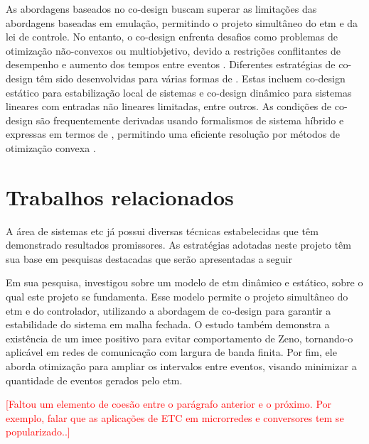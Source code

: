 As abordagens baseados no co-design buscam superar as limitações das abordagens baseadas em emulação, permitindo o projeto simultâneo do \acrshort{etm} e da lei de controle. No entanto, o co-design enfrenta desafios como problemas de otimização não-convexos ou multiobjetivo, devido a restrições conflitantes de desempenho e aumento dos tempos entre eventos \cite{coutinho2021}. Diferentes estratégias de co-design têm sido desenvolvidas para várias formas de . Estas incluem co-design estático para estabilização local de sistemas  e co-design dinâmico para sistemas lineares com entradas não lineares limitadas, entre outros. As condições de co-design são frequentemente derivadas usando formalismos de sistema híbrido e expressas em termos de , permitindo uma eficiente resolução por métodos de otimização convexa \cite{coutinho2021}.

\section{Trabalhos relacionados}

A área de sistemas \acrshort{etc} já possui diversas técnicas estabelecidas que têm demonstrado resultados promissores. As estratégias adotadas neste projeto têm sua base em pesquisas destacadas que serão apresentadas a seguir

Em sua pesquisa, \cite{coutinho2021} investigou sobre um modelo de \acrshort{etm} dinâmico e estático, sobre o qual este projeto se fundamenta. Esse modelo permite o projeto simultâneo do \acrshort{etm} e do controlador, utilizando a abordagem de co-design para garantir a estabilidade do sistema em malha fechada. O estudo também demonstra a existência de um \acrfull{imee} positivo para evitar comportamento de Zeno, tornando-o aplicável em redes de comunicação com largura de banda finita. Por fim, ele aborda otimização para ampliar os intervalos entre eventos, visando minimizar a quantidade de eventos gerados pelo \acrshort{etm}. 

\textcolor{red}{[Faltou um elemento de coesão entre o parágrafo anterior e o próximo. Por exemplo, falar que as aplicações de ETC em microrredes e conversores tem se popularizado..]}


